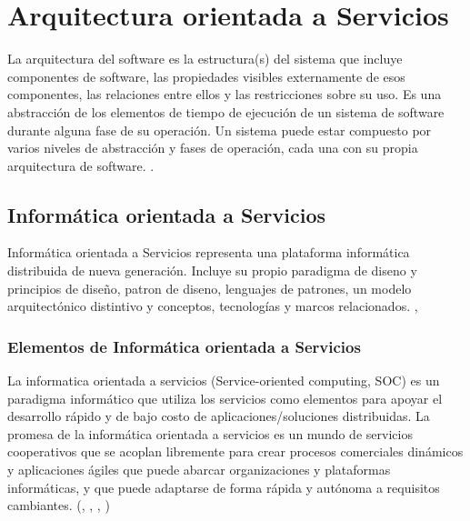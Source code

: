 
\setchapterpreamble[u]{\margintoc}

\chapter{Arquitectura orientada a Servicios}
\label{ch:SOA}

La arquitectura del software es la estructura(s) del sistema que incluye componentes de software, las propiedades visibles externamente de esos componentes, las relaciones entre ellos y las restricciones sobre su uso.  Es una abstracción de los elementos de tiempo de ejecución de un sistema de software durante alguna fase de su operación. Un sistema puede estar compuesto por varios niveles de abstracción y fases de operación, cada una con su propia arquitectura de software. \cite{Fielding2000}.  


\section{Informática orientada a Servicios}

Informática orientada a Servicios representa una plataforma informática distribuida de nueva generación. 
 Incluye su propio \gls{paradigma de diseno} y principios de diseño,  \gls{patron de diseno}, lenguajes de patrones, un modelo arquitectónico distintivo y conceptos, tecnologías y marcos relacionados.
 \cite{Erl2007a}, \cite{Erl2008}
 
 \subsection{Elementos de Informática orientada a  Servicios}
 
 La \gls{informatica orientada a servicios} (Service-oriented computing, SOC) es un paradigma informático que utiliza los servicios como
 elementos para apoyar el desarrollo rápido y de bajo costo de aplicaciones/soluciones  distribuidas. La promesa de la informática orientada a servicios es un mundo de servicios cooperativos  que se acoplan libremente para crear  procesos comerciales dinámicos y aplicaciones ágiles  que puede abarcar organizaciones y plataformas informáticas, y que puede adaptarse de forma rápida y autónoma  a   requisitos cambiantes. (, , ,  )
 
